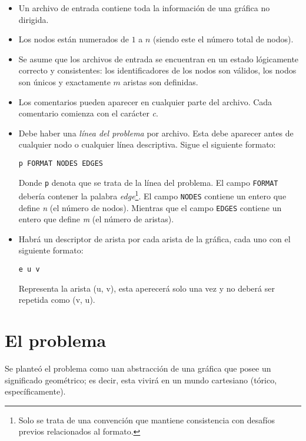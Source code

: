 \documentclass[a4paper]{report}
\begin{document}
\begin{itemize}
\item Un archivo de entrada contiene toda la informaci\'on de una gr\'afica no
  dirigida.
\item Los nodos est\'an numerados de $1$ a $n$ (siendo este el n\'umero total
  de nodos).
\item Se asume que los archivos de entrada se encuentran en un estado l\'ogicamente
  correcto y consistentes: los identificadores de los nodos son v\'alidos, los nodos
  son \'unicos y exactamente $m$ aristas son definidas.
\item Los comentarios pueden aparecer en cualquier parte del archivo. Cada comentario
  comienza con el car\'acter \textit{c}.
\item Debe haber una \textit{l\'inea del problema} por archivo. Esta debe aparecer
  antes de cualquier nodo o cualquier l\'inea descriptiva. Sigue el siguiente formato:

  \begin{center}
    \texttt{p FORMAT NODES EDGES}
  \end{center}

  Donde \texttt{p} denota que se trata de la l\'inea del problema. El campo \texttt{FORMAT}
  deber\'ia contener la palabra \textit{edge}\footnote{Solo se trata de una convenci\'on
    que mantiene consistencia con desaf\'ios previos relacionados al formato.}. El campo
  \texttt{NODES} contiene un entero que define \textit{n} (el n\'umero de nodos). Mientras
  que el campo \texttt{EDGES} contiene un entero que define \textit{m} (el n\'umero de aristas).

\item Habr\'a un descriptor de arista por cada arista de la gr\'afica, cada uno con el siguiente
  formato:

  \begin{center}
    \texttt{e u v}
  \end{center}
  Representa la arista (u, v), esta aperecer\'a solo una vez y no deber\'a ser repetida como
  (v, u).
\end{itemize}

\section{El problema}

Se plante\'o el problema como uan abstracci\'on de una gr\'afica que posee un significado geom\'etrico;
es decir, esta vivir\'a en un mundo cartesiano (t\'orico, espec\'ificamente).
\end{document}
